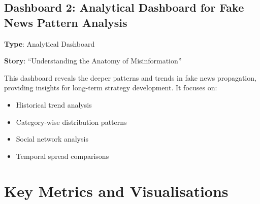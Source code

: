 \documentclass[12pt,a4paper]{article}
\begin{document}
\subsection{Dashboard 2: Analytical Dashboard for Fake News Pattern Analysis}

\textbf{Type}: Analytical Dashboard

\textbf{Story}: ``Understanding the Anatomy of Misinformation''

This dashboard reveals the deeper patterns and trends in fake news propagation, providing insights for long-term strategy development. It focuses on:
\begin{itemize}
    \item Historical trend analysis
    \item Category-wise distribution patterns
    \item Social network analysis
    \item Temporal spread comparisons
\end{itemize}

\section{Key Metrics and Visualisations}
\end{document}
